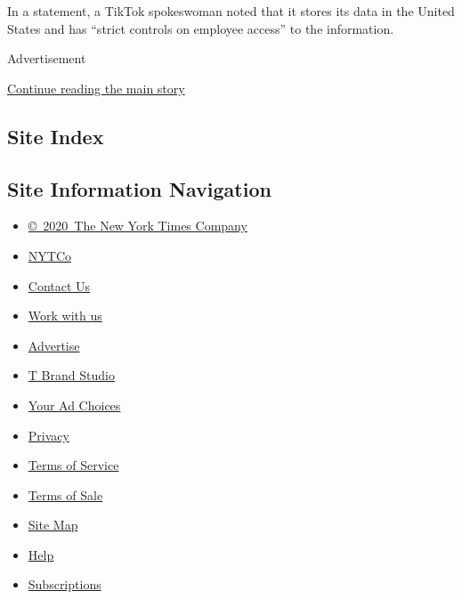 In a statement, a TikTok spokeswoman noted that it stores its data in
the United States and has ``strict controls on employee access'' to the
information.

Advertisement

\protect\hyperlink{after-bottom}{Continue reading the main story}

\hypertarget{site-index}{%
\subsection{Site Index}\label{site-index}}

\hypertarget{site-information-navigation}{%
\subsection{Site Information
Navigation}\label{site-information-navigation}}

\begin{itemize}
\tightlist
\item
  \href{https://help.nytimes.com/hc/en-us/articles/115014792127-Copyright-notice}{©~2020~The
  New York Times Company}
\end{itemize}

\begin{itemize}
\tightlist
\item
  \href{https://www.nytco.com/}{NYTCo}
\item
  \href{https://help.nytimes.com/hc/en-us/articles/115015385887-Contact-Us}{Contact
  Us}
\item
  \href{https://www.nytco.com/careers/}{Work with us}
\item
  \href{https://nytmediakit.com/}{Advertise}
\item
  \href{http://www.tbrandstudio.com/}{T Brand Studio}
\item
  \href{https://www.nytimes.com/privacy/cookie-policy\#how-do-i-manage-trackers}{Your
  Ad Choices}
\item
  \href{https://www.nytimes.com/privacy}{Privacy}
\item
  \href{https://help.nytimes.com/hc/en-us/articles/115014893428-Terms-of-service}{Terms
  of Service}
\item
  \href{https://help.nytimes.com/hc/en-us/articles/115014893968-Terms-of-sale}{Terms
  of Sale}
\item
  \href{https://spiderbites.nytimes.com}{Site Map}
\item
  \href{https://help.nytimes.com/hc/en-us}{Help}
\item
  \href{https://www.nytimes.com/subscription?campaignId=37WXW}{Subscriptions}
\end{itemize}
